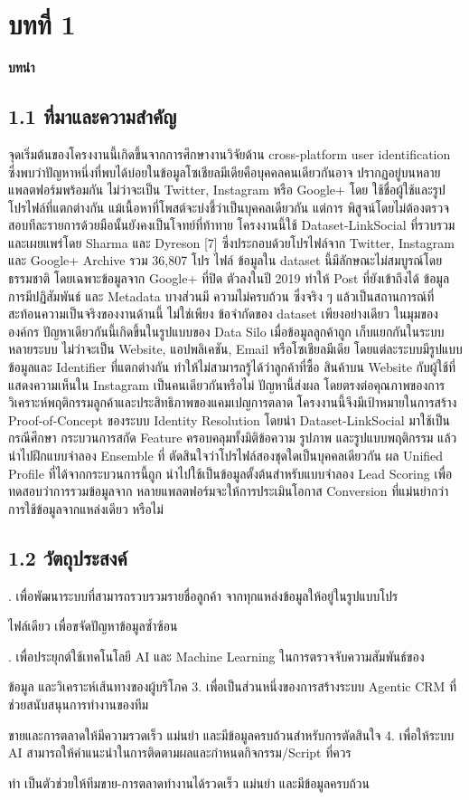 \documentclass[12pt,a4paper]{report}
\begin{document}
\chapter*{บทที่ 1}
\begin{center}\Large\bfseries บทนํา\end{center}
\section*{1.1 ที่มาและความสําคัญ}
จุดเริ่มต้นของโครงงานนี้เกิดขึ้นจากการศึกษางานวิจัยด้าน cross-platform user identification ซึ่งพบว่าปัญหาหนึ่งที่พบได้บ่อยในข้อมูลโซเชียลมีเดียคือบุคคลคนเดียวกันอาจ ปรากฏอยู่บนหลายแพลตฟอร์มพร้อมกัน ไม่ว่าจะเป็น Twitter, Instagram หรือ Google+ โดย ใช้ชื่อผู้ใช้และรูปโปรไฟล์ที่แตกต่างกัน แม้เนื้อหาที่โพสต์จะบ่งชี้ว่าเป็นบุคคลเดียวกัน แต่การ พิสูจน์โดยไม่ต้องตรวจสอบทีละรายการด้วยมือนั้นยังคงเป็นโจทย์ที่ท้าทาย โครงงานนี้ใช้ Dataset-LinkSocial ที่รวบรวมและเผยแพร่โดย Sharma และ Dyreson [7] ซึ่งประกอบด้วยโปรไฟล์จาก Twitter, Instagram และ Google+ Archive รวม 36,807 โปร ไฟล์ ข้อมูลใน dataset นี้มีลักษณะไม่สมบูรณ์โดยธรรมชาติ โดยเฉพาะข้อมูลจาก Google+ ที่ปิด ตัวลงในปี 2019 ทำให้ Post ที่ยังเข้าถึงได้ ข้อมูลการมีปฏิสัมพันธ์ และ Metadata บางส่วนมี ความไม่ครบถ้วน ซึ่งจริง ๆ แล้วเป็นสถานการณ์ที่สะท้อนความเป็นจริงของงานด้านนี้ ไม่ใช่เพียง ข้อจำกัดของ dataset เพียงอย่างเดียว ในมุมขององค์กร ปัญหาเดียวกันนี้เกิดขึ้นในรูปแบบของ Data Silo เมื่อข้อมูลลูกค้าถูก เก็บแยกกันในระบบหลายระบบ ไม่ว่าจะเป็น Website, แอปพลิเคชัน, Email หรือโซเชียลมีเดีย โดยแต่ละระบบมีรูปแบบข้อมูลและ Identifier ที่แตกต่างกัน ทำให้ไม่สามารถรู้ได้ว่าลูกค้าที่ซื้อ สินค้าบน Website กับผู้ใช้ที่แสดงความเห็นใน Instagram เป็นคนเดียวกันหรือไม่ ปัญหานี้ส่งผล โดยตรงต่อคุณภาพของการวิเคราะห์พฤติกรรมลูกค้าและประสิทธิภาพของแคมเปญการตลาด โครงงานนี้จึงมีเป้าหมายในการสร้าง Proof-of-Concept ของระบบ Identity Resolution โดยนำ Dataset-LinkSocial มาใช้เป็นกรณีศึกษา กระบวนการสกัด Feature ครอบคลุมทั้งมิติข้อความ รูปภาพ และรูปแบบพฤติกรรม แล้วนำไปฝึกแบบจำลอง Ensemble ที่ ตัดสินใจว่าโปรไฟล์สองชุดใดเป็นบุคคลเดียวกัน ผล Unified Profile ที่ได้จากกระบวนการนี้ถูก นำไปใช้เป็นข้อมูลตั้งต้นสำหรับแบบจำลอง Lead Scoring เพื่อทดสอบว่าการรวมข้อมูลจาก หลายแพลตฟอร์มจะให้การประเมินโอกาส Conversion ที่แม่นยำกว่าการใช้ข้อมูลจากแหล่งเดียว หรือไม่\par
\section*{1.2 วัตถุประสงค์}
. เพื่อพัฒนาระบบที่สามารถรวบรวมรายชื่อลูกค้า จากทุกแหล่งข้อมูลให้อยู่ในรูปแบบโปร\par
ไฟล์เดียว เพื่อขจัดปัญหาข้อมูลซ้ำซ้อน\par
\clearpage
{}. เพื่อประยุกต์ใช้เทคโนโลยี AI และ Machine Learning ในการตรวจจับความสัมพันธ์ของ\par
ข้อมูล และวิเคราะห์เส้นทางของผู้บริโภค 3. เพื่อเป็นส่วนหนึ่งของการสร้างระบบ Agentic CRM ที่ช่วยสนับสนุนการทำงานของทีม\par
ขายและการตลาดให้มีความรวดเร็ว แม่นยำ และมีข้อมูลครบถ้วนสำหรับการตัดสินใจ 4. เพื่อให้ระบบ AI สามารถให้คำแนะนำในการติดตามผลและกำหนดกิจกรรม/Script ที่ควร\par
ทำ เป็นตัวช่วยให้ทีมขาย-การตลาดทํางานได้รวดเร็ว แม่นยำ และมีข้อมูลครบถ้วน\par
\end{document}
